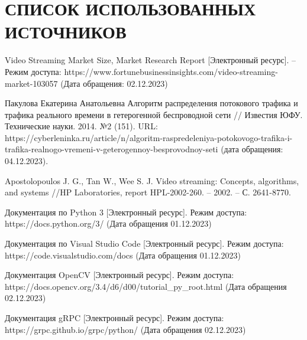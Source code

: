 \section*{СПИСОК ИСПОЛЬЗОВАННЫХ ИСТОЧНИКОВ}

\begingroup
\renewcommand{\section}[2]{}
\begin{thebibliography}{}
	 Video Streaming Market Size, Market Research Report [Электронный ресурс]. -- Режим доступа: https://www.fortunebusinessinsights.com/video-streaming-market-103057 (Дата обращения: 02.12.2023)
	
	 Пакулова Екатерина Анатольевна Алгоритм распределения потокового трафика и трафика реального времени в гетерогенной беспроводной сети // Известия ЮФУ. Технические науки. 2014. №2 (151). URL: https://cyberleninka.ru/article/n/algoritm-raspredeleniya-potokovogo-trafika-i-trafika-realnogo-vremeni-v-geterogennoy-besprovodnoy-seti (дата обращения: 04.12.2023).
	
	 Apostolopoulos J. G., Tan W., Wee S. J. Video streaming: Concepts, algorithms, and systems //HP Laboratories, report HPL-2002-260. – 2002. – С. 2641-8770.
	
	 Документация по Python 3 [Электронный ресурс]. Режим доступа: https://docs.python.org/3/ (Дата обращения 01.12.2023)
	
	 Документация по Visual Studio Code [Электронный ресурс]. Режим доступа: https://code.visualstudio.com/docs (Дата обращения 01.12.2023)
	
	 Документация OpenCV [Электронный ресурс]. Режим доступа: https://docs.opencv.org/3.4/d6/d00/tutorial\_py\_root.html (Дата обращения 02.12.2023)
	
	 Документация gRPC [Электронный ресурс]. Режим доступа: https://grpc.github.io/grpc/python/ (Дата обращения 02.12.2023)
	
\end{thebibliography}
\endgroup

\pagebreak